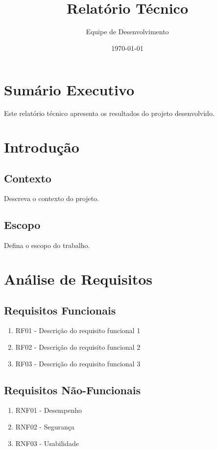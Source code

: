 \documentclass[12pt,a4paper]{article}
\title{Relatório Técnico}
\author{Equipe de Desenvolvimento}
\date{\today}
\begin{document}
\maketitle

\tableofcontents
\newpage

\section{Sumário Executivo}

Este relatório técnico apresenta os resultados do projeto desenvolvido.

\section{Introdução}

\subsection{Contexto}

Descreva o contexto do projeto.

\subsection{Escopo}

Defina o escopo do trabalho.

\section{Análise de Requisitos}

\subsection{Requisitos Funcionais}

\begin{enumerate}
  \item RF01 - Descrição do requisito funcional 1
  \item RF02 - Descrição do requisito funcional 2
  \item RF03 - Descrição do requisito funcional 3
\end{enumerate}

\subsection{Requisitos Não-Funcionais}

\begin{enumerate}
  \item RNF01 - Desempenho
  \item RNF02 - Segurança
  \item RNF03 - Usabilidade
\end{enumerate}
\end{document}
